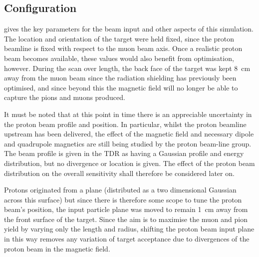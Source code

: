 \subsection{Configuration} 

 gives the key parameters for the
beam input and other aspects of this simulation.  The location and orientation
of the target were held fixed, since the proton beamline is fixed with respect
to the muon beam axis.  Once a realistic proton beam becomes available, these
values would also benefit from optimisation, however.  During the scan over
length, the back face of the target was kept 8~cm away from the muon beam since
the radiation shielding has previously been optimised, and since beyond this
the magnetic field will no longer be able to capture the pions and muons
produced.

It must be noted that at this point in time there is an appreciable
uncertainty in the proton beam profile and position.  In particular, whilst the
proton beamline upstream has been delivered, the effect of the magnetic
field and necessary dipole and quadrupole magnetics are still being studied by
the proton beam-line group.  The beam profile is given in the \phaseI \ac{TDR}
as having a Gaussian profile and energy distribution, but no divergence or
location is given.  The effect of the proton beam distribution on the overall
sensitivity shall therefore be considered later on.

Protons originated from a plane (distributed as a two dimensional Gaussian
across this surface) but since there is therefore some scope to tune the proton
beam's position, the input particle plane was moved to remain 1~cm away from
the front surface of the target.  Since the aim is to maximise the muon and
pion yield by varying only the length and radius, shifting the proton beam
input plane in this way removes any variation of target acceptance due to
divergences of the proton beam in the magnetic field.

